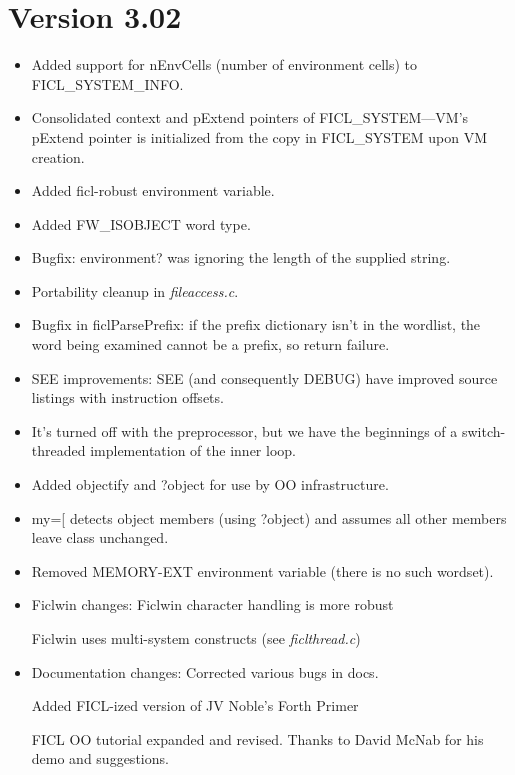 \section*{Version 3.02}
\begin{itemize}[noitemsep]
	\item Added support for nEnvCells (number of environment cells)
	to FICL\_SYSTEM\_INFO.

	\item Consolidated context and pExtend pointers of
	FICL\_SYSTEM—VM's pExtend pointer is initialized from the copy
	in FICL\_SYSTEM upon VM creation.

	\item Added ficl-robust environment variable.

	\item Added FW\_ISOBJECT word type.

	\item Bugfix: environment? was ignoring the length of the
	supplied string.

	\item Portability cleanup in \textit{fileaccess.c}.

	\item Bugfix in ficlParsePrefix: if the prefix dictionary isn't
	in the wordlist, the word being examined cannot be a prefix, so
	return failure.

	\item SEE improvements: SEE (and consequently DEBUG) have
	improved source listings with instruction offsets.

	\item It's turned off with the preprocessor, but we have the
	beginnings of a switch-threaded implementation of the inner loop.

	\item Added objectify and ?object for use by OO infrastructure.

	\item my=[ detects object members (using ?object) and assumes
	all other members leave class unchanged.

	\item Removed MEMORY-EXT environment variable (there is no such
	wordset).

	\item Ficlwin changes:
		\subitem Ficlwin character handling is more robust

		\subitem Ficlwin uses multi-system constructs (see
		\textit{ficlthread.c})

	\item Documentation changes:
		\subitem Corrected various bugs in docs.

		\subitem Added FICL-ized version of JV Noble's Forth
		Primer

		\subitem FICL OO tutorial expanded and revised. Thanks
		to David McNab for his demo and suggestions.
\end{itemize}


